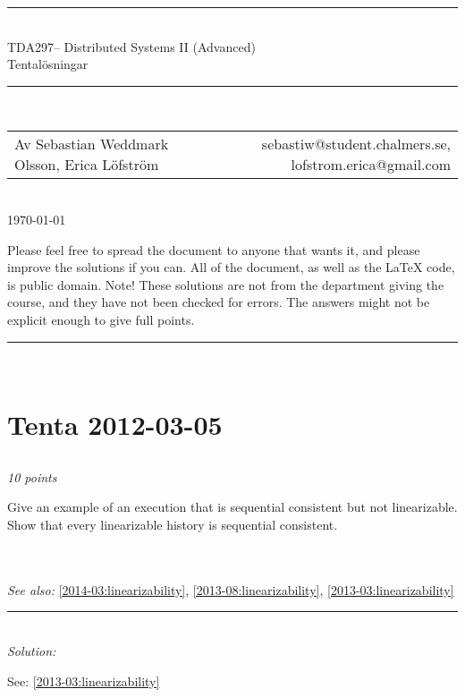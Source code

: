 \documentclass[a4paper]{article}
\makeatletter
\newcommand{\coursecode}{TDA297}
\newcommand{\coursename}{Distributed Systems II (Advanced)}
\newcommand{\authorname}{Sebastian Weddmark Olsson, Erica Löfström}
\newcommand{\authormail}{sebastiw@student.chalmers.se, lofstrom.erica@gmail.com}
\newcommand{\doctitle}{Tentalösningar}
\newcommand{\horrule}[1]{\rule{\linewidth}{#1}} %
\newcommand{\points}[1]{\subsection{} \textit{#1 points}\\}
\newcommand{\question}[2][]{
  \noindent
  \parbox[t]{\textwidth}{#1 \parbox[t]{0.95\textwidth}{#2}}\\
}
\newcommand{\seealso}[1]{\\\textit{See also:} #1}
\newcommand{\solution}[1]{\\\horrule{0.5pt}\\[3pt]\textit{Solution: }\\[0.1cm]\begin{minipage}{\textwidth}#1\end{minipage}}
\makeatother
\begin{document}
\thispagestyle{plain} %
\begin{center}
\horrule{0.5pt} \\[0.3cm] %
%
\huge \coursecode -- \coursename \\[1mm]
\Large \doctitle \\
\normalsize %
\horrule{2pt} \\[0.1cm] %
\begin{tabular}{ l r }
Av \authorname & \authormail
\end{tabular}\\[0.1cm]
\footnotesize \today\\[0.4cm]
\end{center}
{\footnotesize
Please feel free to spread the document to anyone that wants it, and please improve the solutions if you can. All of the document, as well as the \LaTeX{} code, is public domain.
Note! These solutions are not from the department giving the course, and they have not been checked for errors. The answers might not be explicit enough to give full points.\\
}
\horrule{0.5pt} %
\normalsize %
\\[2.5cm]

\section{Tenta 2012-03-05}

\points{10}
\question{
  Give an example of an execution that is sequential consistent but
  not linearizable. \\
  Show that every linearizable history is sequential consistent.
}
\seealso{\ref{2014-03:linearizability}, \ref{2013-08:linearizability}, \ref{2013-03:linearizability}}
\solution{See: \ref{2013-03:linearizability}}
\end{document}
